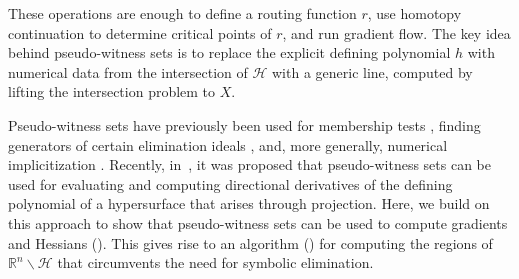 \documentclass[11pt]{article}
\numberwithin{equation}{section}
\theoremstyle{plain}
\theoremstyle{definition}
\theoremstyle{remark}
\newcommand{\sH}{{\mathcal H}}
\newcommand\bR{{\mathbb R}}
\begin{document}
These operations are enough to define a routing function $r$,
use homotopy continuation \cite{bates2024numericalnonlinearalgebra, BertiniBook,SommeseWamplerBook} to determine critical points of $r$, and run gradient flow. The key idea behind pseudo-witness sets is to replace the explicit defining polynomial $h$ with numerical data from the intersection of $\sH$ with a generic line, computed by lifting the intersection problem to $X$.

Pseudo-witness sets have previously been used for membership tests \cite{HauensteinSommese2013}, finding generators of certain elimination ideals \cite{HauensteinIkenmeyerLandsberg2013}, and, more generally, numerical implicitization \cite{ChenKileel2019}. Recently, in~\cite{ImplicitPolynomials}, it was proposed that pseudo-witness sets can be used for evaluating and computing directional derivatives of the defining polynomial of a hypersurface that arises through projection. Here, we build on this approach to show that pseudo-witness sets can be used to compute gradients and  Hessians (). This gives rise to an algorithm () for computing the regions of $\bR^n\smallsetminus\sH$ that circumvents the need for symbolic elimination.
\end{document}
